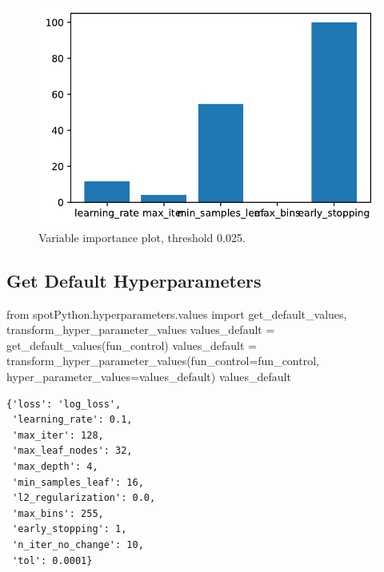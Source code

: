 \documentclass[
  letterpaper,
  DIV=11,
  numbers=noendperiod]{scrreprt}
\newenvironment{Shaded}{\begin{snugshade}}{\end{snugshade}}
\newcommand{\ImportTok}[1]{\textcolor[rgb]{0.00,0.46,0.62}{#1}}
\newcommand{\NormalTok}[1]{\textcolor[rgb]{0.00,0.23,0.31}{#1}}
\newcommand{\OperatorTok}[1]{\textcolor[rgb]{0.37,0.37,0.37}{#1}}
\begin{document}
\begin{figure}[H]

{\centering \includegraphics{17_spot_hpt_sklearn_multiclass_classification_xgb_files/figure-pdf/cell-27-output-1.pdf}

}

\caption{Variable importance plot, threshold 0.025.}

\end{figure}

\hypertarget{get-default-hyperparameters-4}{%
\subsection{Get Default
Hyperparameters}\label{get-default-hyperparameters-4}}

\begin{Shaded}
\begin{Highlighting}[]
\ImportTok{from}\NormalTok{ spotPython.hyperparameters.values }\ImportTok{import}\NormalTok{ get\_default\_values, transform\_hyper\_parameter\_values}
\NormalTok{values\_default }\OperatorTok{=}\NormalTok{ get\_default\_values(fun\_control)}
\NormalTok{values\_default }\OperatorTok{=}\NormalTok{ transform\_hyper\_parameter\_values(fun\_control}\OperatorTok{=}\NormalTok{fun\_control, hyper\_parameter\_values}\OperatorTok{=}\NormalTok{values\_default)}
\NormalTok{values\_default}
\end{Highlighting}
\end{Shaded}

\begin{verbatim}
{'loss': 'log_loss',
 'learning_rate': 0.1,
 'max_iter': 128,
 'max_leaf_nodes': 32,
 'max_depth': 4,
 'min_samples_leaf': 16,
 'l2_regularization': 0.0,
 'max_bins': 255,
 'early_stopping': 1,
 'n_iter_no_change': 10,
 'tol': 0.0001}
\end{verbatim}
\end{document}
